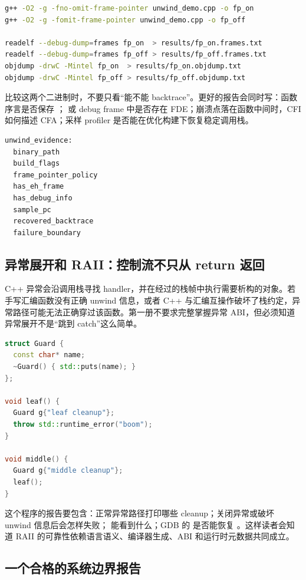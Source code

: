 \begin{lstlisting}[language=bash,caption={保存 unwind 证据的命令}]
g++ -O2 -g -fno-omit-frame-pointer unwind_demo.cpp -o fp_on
g++ -O2 -g -fomit-frame-pointer unwind_demo.cpp -o fp_off

readelf --debug-dump=frames fp_on  > results/fp_on.frames.txt
readelf --debug-dump=frames fp_off > results/fp_off.frames.txt
objdump -drwC -Mintel fp_on  > results/fp_on.objdump.txt
objdump -drwC -Mintel fp_off > results/fp_off.objdump.txt
\end{lstlisting}

比较这两个二进制时，不要只看“能不能 backtrace”。更好的报告会同时写：函数序言是否保存 ； 或 debug frame 中是否存在 FDE；崩溃点落在函数中间时，CFI 如何描述 CFA；采样 profiler 是否能在优化构建下恢复稳定调用栈。

\begin{lstlisting}[numbers=none,caption={unwind 证据包字段}]
unwind_evidence:
  binary_path
  build_flags
  frame_pointer_policy
  has_eh_frame
  has_debug_info
  sample_pc
  recovered_backtrace
  failure_boundary
\end{lstlisting}

\subsection{异常展开和 RAII：控制流不只从 return 返回}

C++ 异常会沿调用栈寻找 handler，并在经过的栈帧中执行需要析构的对象。若手写汇编函数没有正确 unwind 信息，或者 C++ 与汇编互操作破坏了栈约定，异常路径可能无法正确穿过该函数。第一册不要求完整掌握异常 ABI，但必须知道异常展开不是“跳到 catch”这么简单。

\begin{lstlisting}[language=C++,caption={用于观察异常展开的小程序}]
struct Guard {
  const char* name;
  ~Guard() { std::puts(name); }
};

void leaf() {
  Guard g{"leaf cleanup"};
  throw std::runtime_error("boom");
}

void middle() {
  Guard g{"middle cleanup"};
  leaf();
}
\end{lstlisting}

这个程序的报告要包含：正常异常路径打印哪些 cleanup；关闭异常或破坏 unwind 信息后会怎样失败； 能看到什么；GDB 的  是否能恢复 。这样读者会知道 RAII 的可靠性依赖语言语义、编译器生成、ABI 和运行时元数据共同成立。

\subsection{一个合格的系统边界报告}

